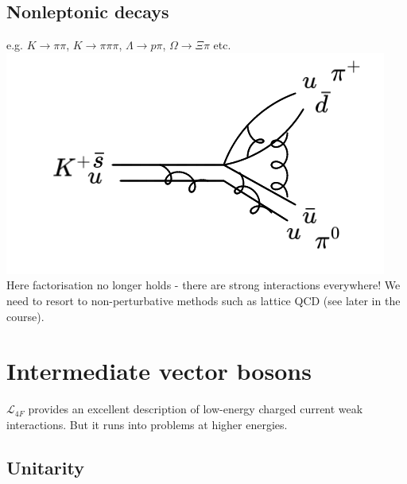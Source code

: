 \documentclass[a4paper,12pt]{article}
\begin{document}
\subsection{Nonleptonic decays}

e.g. $K \to \pi \pi$, $K \to \pi \pi \pi$, $\Lambda \to p \pi$, $\Omega \to \Xi \pi$ etc.
\newline
  \includegraphics[width=0.5\linewidth]{figs/diag_4.png}
\newline
Here factorisation no longer holds - there are strong interactions everywhere! We need to resort to non-perturbative methods such as lattice QCD (see later in the course).
\newpage
\section{Intermediate vector bosons}
$\mathcal{L}_{4F}$ provides an excellent description of low-energy charged current weak interactions. But it runs into problems at higher energies.
\subsection{Unitarity}
\end{document}
